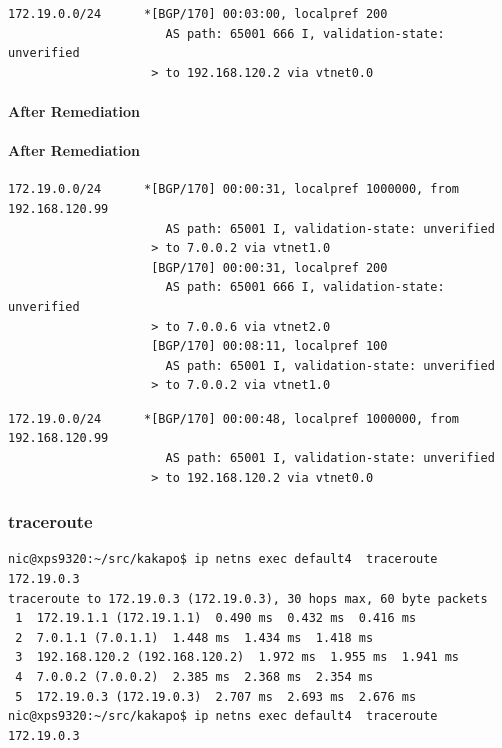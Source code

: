 \begin{lstlisting}[title=As seen at ASBR2]
172.19.0.0/24      *[BGP/170] 00:03:00, localpref 200
                      AS path: 65001 666 I, validation-state: unverified
                    > to 192.168.120.2 via vtnet0.0
\end{lstlisting}

\paragraph{After Remediation}
\paragraph{After Remediation}

\begin{lstlisting}[title=As seen at ASBR1]
172.19.0.0/24      *[BGP/170] 00:00:31, localpref 1000000, from 192.168.120.99
                      AS path: 65001 I, validation-state: unverified
                    > to 7.0.0.2 via vtnet1.0
                    [BGP/170] 00:00:31, localpref 200
                      AS path: 65001 666 I, validation-state: unverified
                    > to 7.0.0.6 via vtnet2.0
                    [BGP/170] 00:08:11, localpref 100
                      AS path: 65001 I, validation-state: unverified
                    > to 7.0.0.2 via vtnet1.0
\end{lstlisting}

\begin{lstlisting}[title=As seen at ASBR2]
172.19.0.0/24      *[BGP/170] 00:00:48, localpref 1000000, from 192.168.120.99
                      AS path: 65001 I, validation-state: unverified
                    > to 192.168.120.2 via vtnet0.0
\end{lstlisting}

\subsubsection{traceroute}
\begin{lstlisting}[title=traceroute for normal state\, showing dataplane transit through four virtual routers]
nic@xps9320:~/src/kakapo$ ip netns exec default4  traceroute 172.19.0.3
traceroute to 172.19.0.3 (172.19.0.3), 30 hops max, 60 byte packets
 1  172.19.1.1 (172.19.1.1)  0.490 ms  0.432 ms  0.416 ms
 2  7.0.1.1 (7.0.1.1)  1.448 ms  1.434 ms  1.418 ms
 3  192.168.120.2 (192.168.120.2)  1.972 ms  1.955 ms  1.941 ms
 4  7.0.0.2 (7.0.0.2)  2.385 ms  2.368 ms  2.354 ms
 5  172.19.0.3 (172.19.0.3)  2.707 ms  2.693 ms  2.676 ms
nic@xps9320:~/src/kakapo$ ip netns exec default4  traceroute 172.19.0.3
\end{lstlisting}

